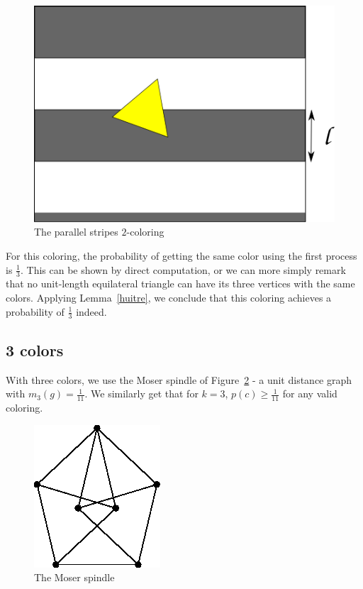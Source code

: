 \documentclass[a4paper,11pt]{article}
\theoremstyle{definition}
\theoremstyle{remark}
\begin{document}
\begin{figure}[h]
\center
\includegraphics[scale=0.5]{path6509.png}
\caption{\label{couleur} The parallel stripes $2$-coloring}
\end{figure}

For this coloring, the probability of getting the same color using the first 
process is $\frac13$. This can be shown by direct computation, or we can 
more simply remark that no unit-length equilateral triangle can have its 
three vertices with the same colors. Applying Lemma~\ref{huitre}, we conclude 
that this coloring achieves a probability of $\frac{1}{3}$ indeed.

\subsection{3 colors}\label{3col}
 With three colors, we use the Moser spindle of Figure~\ref{color} - a unit 
 distance graph with $m_3(g) = \frac{1}{11}$.
 We similarly get that for $k=3$, $p(c) \geq \frac{1}{11}$ for any valid coloring. 

\begin{figure}[h]
\center
\includegraphics[scale=0.4]{T.png}
\caption{\label{color} The Moser spindle}
\end{figure}
\end{document}
